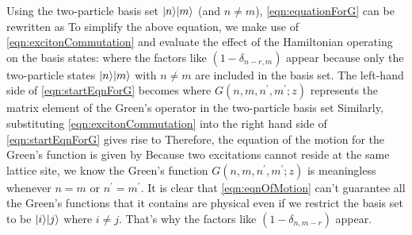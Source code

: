 Using the two-particle basis set $| n \rangle| m \rangle$ (and $n \neq m$), \autoref{eqn:equationForG} can be rewritten as
To simplify the above equation, we make use of \autoref{eqn:excitonCommutation} and evaluate the effect of the 
Hamiltonian operating on the basis states:
where the factors like $(1-\delta_{n-r, m})$ appear because only the two-particle states $| n \rangle| m \rangle$ with 
$n \neq m$ are included in the basis set. 
The left-hand side of \autoref{eqn:startEqnForG} becomes
where $G(n, m, n^{\prime}, m^{\prime}; z)$ represents the matrix element of the Green's operator in the two-particle 
basis set 
Similarly, substituting \autoref{eqn:excitonCommutation} into the right hand side of \autoref{eqn:startEqnForG}  gives
rise to 
Therefore, the equation of the motion for the Green's function is given by
Because two excitations cannot reside at the same lattice site, we know the Green's function 
$G(n, m, n^{\prime}, m^{\prime}; z)$ is meaningless whenever $n=m$ or $n^{\prime} = m^{\prime}$. It is clear that
\autoref{eqn:eqnOfMotion} can't guarantee all the Green's functions that it contains are physical even if we restrict
the basis set to be $| i \rangle| j \rangle$ where $i \neq j$. That's why the factors like  $(1-\delta_{n, m-r})$ appear. 

